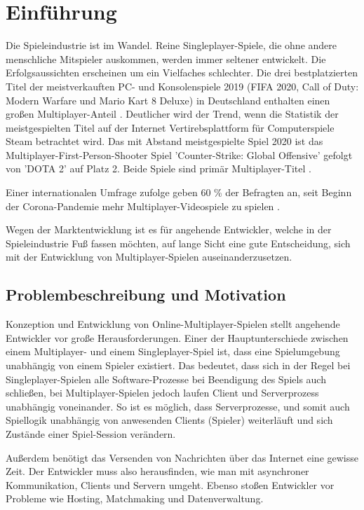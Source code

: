 \chapter{Einführung}
\label{sec:einfuehrung}

Die Spieleindustrie ist im Wandel. Reine Singleplayer-Spiele, die ohne andere menschliche Mitspieler auskommen, werden immer seltener entwickelt. Die Erfolgsaussichten erscheinen um ein Vielfaches schlechter. Die drei bestplatzierten Titel der meistverkauften PC- und Konsolenspiele 2019 (FIFA 2020, Call of Duty: Modern Warfare und Mario Kart 8 Deluxe) in Deutschland enthalten einen großen Multiplayer-Anteil \cite{gameVerbandderdeutschenGamesBranchee.V..2020}. Deutlicher wird der Trend, wenn die Statistik der meistgespielten Titel auf der Internet Vertirebsplattform für Computerspiele Steam betrachtet wird. Das mit Abstand meistgespielte Spiel 2020 ist das Multiplayer-First-Person-Shooter Spiel 'Counter-Strike: Global Offensive' gefolgt von 'DOTA 2' auf Platz 2. Beide Spiele sind primär Multiplayer-Titel \cite{GitHyp.February2021}.

Einer internationalen Umfrage zufolge geben 60 \% der Befragten an, seit Beginn der Corona-Pandemie mehr Multiplayer-Videospiele zu spielen \cite{SimonKucher&Partners.2020}. 

Wegen der Marktentwicklung ist es für angehende Entwickler, welche in der Spieleindustrie Fuß fassen möchten, auf lange Sicht eine gute Entscheidung, sich mit der Entwicklung von Multiplayer-Spielen auseinanderzusetzen.

\section{Problembeschreibung und Motivation}

Konzeption und Entwicklung von Online-Multiplayer-Spielen stellt angehende Entwickler vor große Herausforderungen. Einer der Hauptunterschiede zwischen einem Multiplayer- und einem Singleplayer-Spiel ist, dass eine Spielumgebung unabhängig von einem Spieler existiert. Das bedeutet, dass sich in der Regel bei Singleplayer-Spielen alle Software-Prozesse bei Beendigung des Spiels auch schließen, bei Multiplayer-Spielen jedoch laufen Client und Serverprozess unabhängig voneinander. So ist es möglich, dass Serverprozesse, und somit auch Spiellogik unabhängig von anwesenden Clients (Spieler) weiterläuft und sich Zustände einer Spiel-Session verändern. 

Außerdem benötigt das Versenden von Nachrichten über das Internet eine gewisse Zeit. Der Entwickler muss also herausfinden, wie man mit asynchroner Kommunikation, Clients und Servern umgeht. Ebenso stoßen Entwickler vor Probleme wie Hosting, Matchmaking und Datenverwaltung.
\cite{Payne.18.09.2019}

